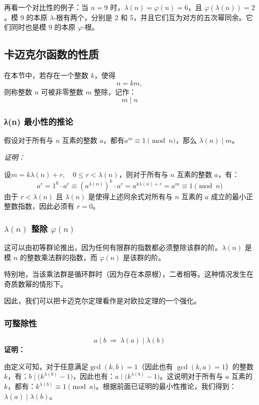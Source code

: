 再看一个对比性的例子：当 $n = 9$ 时，$\lambda(n) = \varphi(n) = 6$，且 $\varphi(\lambda(n)) = 2$。模 9 的本原 $\lambda$-根有两个，分别是 2 和 5，并且它们互为对方的五次幂同余。它们同时也是模 9 的本原 $\varphi$-根。
\subsection{卡迈克尔函数的性质}
在本节中，若存在一个整数 $k$，使得
$$
n = k m,~
$$
则称整数 $n$ 可被非零整数 $m$ 整除，记作：
$$
m \mid n~
$$
\subsubsection{λ(n) 最小性的推论}
假设对于所有与 $n$ 互素的整数 $a$，都有$a^{m} \equiv 1 \pmod{n}$，那么 $\lambda(n) \mid m$。

\textsl{证明：}

设$m = k \lambda(n) + r, \quad 0 \le r < \lambda(n)$，则对于所有与 $n$ 互素的整数 $a$，有：
$$
a^{r} = 1^{k} \cdot a^{r} \equiv \left(a^{\lambda(n)}\right)^{k} \cdot a^{r} = a^{k\lambda(n) + r} = a^{m} \equiv 1 \pmod{n}~
$$
由于 $r < \lambda(n)$ 且 $\lambda(n)$ 是使得上述同余式对所有与 $n$ 互素的 $a$ 成立的最小正整数指数，因此必须有 $r = 0$。
\subsubsection{$\lambda(n)$ 整除 $\varphi(n)$}
这可以由初等群论推出，因为任何有限群的指数都必须整除该群的阶。$\lambda(n)$ 是模 $n$ 的整数乘法群的指数，而 $\varphi(n)$ 是该群的阶。

特别地，当该乘法群是循环群时（因为存在本原根），二者相等。这种情况发生在奇质数幂的情形下。

因此，我们可以把卡迈克尔定理看作是对欧拉定理的一个强化。
\subsubsection{可整除性}
$$
a \mid b \ \Rightarrow \ \lambda(a) \mid \lambda(b)~
$$
\textbf{证明：}

由定义可知，对于任意满足$\gcd(k, b) = 1$（因此也有 $\gcd(k, a) = 1$）的整数 $k$，有：$b \mid \bigl(k^{\lambda(b)} - 1\bigr)$，因此也有：$a \mid \bigl(k^{\lambda(b)} - 1\bigr)$。这说明对于所有与 $a$ 互素的 $k$，都有：$k^{\lambda(b)} \equiv 1 \pmod{a}$。根据前面已证明的最小性推论，我们得到：$
\lambda(a) \mid \lambda(b)$。
